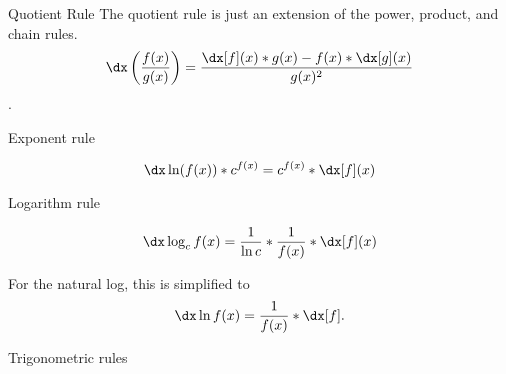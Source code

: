 \begin{psec}{Quotient Rule}\label{rule:derivative quotient} The quotient rule is just an extension of the
    power, product, and chain rules.
    \begin{equation}
        \dx \left(\frac{f(x)}{g(x)}\right) = \frac{\dx[f](x) * g(x) - f(x) * \dx[g](x)
        }{g(x)^2}
    \end{equation}.

\end{psec}

\begin{psec}{Exponent rule}\label{rule:derivative exponent}

    \begin{equation}
        \dx \ln(f(x)) * c ^ {f(x)} = c ^ {f(x)} * \dx[f](x)
    \end{equation}

\end{psec}

\begin{psec}{Logarithm rule}\label{rule:derivative log}

    \begin{equation}
        \dx \log_c f(x) = \frac{1}{\ln c} * \frac{1}{f(x)} * \dx[f] (x)
    \end{equation}

    For the natural log, this is simplified to
    \begin{equation*}
        \dx \ln f(x) = \frac{1}{f(x)} * \dx[f].
    \end{equation*}

\end{psec}


\begin{psec}{Trigonometric rules}


\end{psec}
